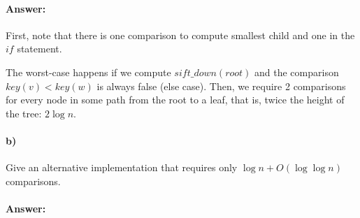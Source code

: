 \documentclass[a4paper]{article}
\begin{document}
\paragraph{Answer:} First, note that there is one comparison to compute smallest child and one in the ${if}$ statement.
 
The worst-case happens if we compute ${sift\_down}({root})$ and the comparison ${key}(v) < {key}(w)$ is always false (else case). Then, we require 2 comparisons for every node in some path from the root to a leaf, that is, twice the height of the tree:  $2 \log n$.

\paragraph{b) } Give an alternative implementation that requires only $\log n + O(\log \log n)$ comparisons.

\paragraph{Answer:}
\end{document}
